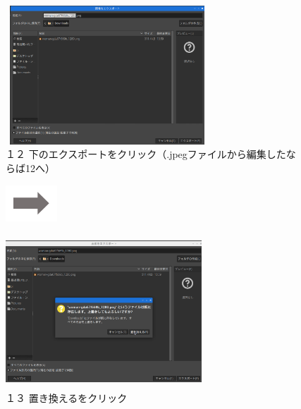\documentclass[a4paper,12pt]{jarticle}
\begin{document}
\begin{figure}
  \begin{minipage}{\textwidth}
    \begin{minipage}{7.7cm}
      \includegraphics[width=7.615cm,height=5.209cm]{textbook-img137.png}\\
      １２
      下のエクスポートをクリック（.jpegファイルから編集したならば12へ）
    \end{minipage}
    \includegraphics[width=1.919cm,height=1.365cm]{textbook-img135.png}
    \begin{minipage}{7.786cm}
      \includegraphics[width=7.352cm,height=5.756cm]{textbook-img136.png}\\
      １３ 置き換えるをクリック
    \end{minipage}
  \end{minipage}

  \bigskip



\end{figure}
\end{document}
